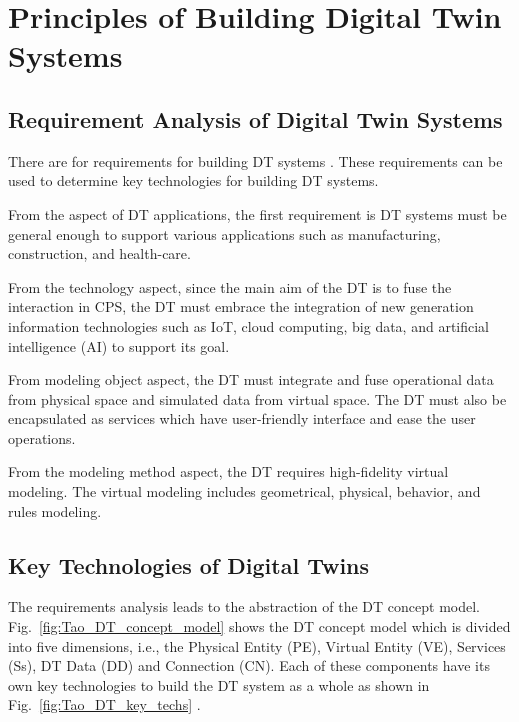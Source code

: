 \documentclass[article,table]{aaltoseries}
\begin{document}

\section{Principles of Building Digital Twin Systems}
\subsection{Requirement Analysis of Digital Twin Systems}
There are for requirements for building DT systems \cite{Tao2019}. These requirements can be used to determine key technologies for building DT systems.

From the aspect of DT applications, the first requirement is DT systems must be general enough to support various applications such as manufacturing, construction, and health-care.

From the technology aspect, since the main aim of the DT is to fuse the interaction in CPS, the DT must embrace the integration of new generation information technologies such as IoT, cloud computing, big data, and artificial intelligence (AI) to support its goal.

From modeling object aspect, the DT must integrate and fuse operational data from physical space and simulated data from virtual space. The DT must also be encapsulated as services which have user-friendly interface and ease the user operations.

From the modeling method aspect, the DT requires high-fidelity virtual modeling. The virtual modeling includes geometrical, physical, behavior, and rules modeling.

\subsection{Key Technologies of Digital Twins}
The requirements analysis leads to the abstraction of the DT concept model. Fig.~\ref{fig:Tao_DT_concept_model} shows the DT concept model which is divided into five dimensions, i.e., the Physical Entity (PE), Virtual Entity (VE), Services (Ss), DT Data (DD) and Connection (CN). Each of these components have its own key technologies to build the DT system as a whole as shown in Fig.~\ref{fig:Tao_DT_key_techs} \cite{Tao2019} .
\end{document}
